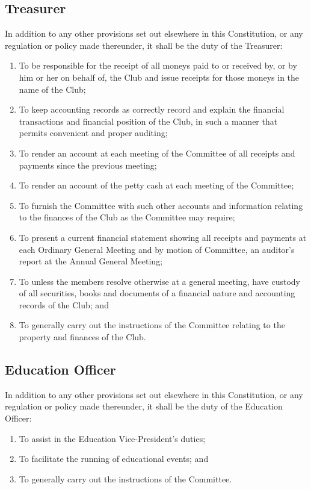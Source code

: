 \documentclass[11pt]{article} %
\begin{document}
\subsection{Treasurer}
In addition to any other provisions set out elsewhere in this Constitution, or any regulation or policy made thereunder, it shall be the duty of the Treasurer:
\begin{enumerate}
	\item To be responsible for the receipt of all moneys paid to or received by, or by him or her on behalf of, the Club and issue receipts for those moneys in the name of the Club;
	\item To keep accounting records as correctly record and explain the financial transactions and financial position of the Club, in such a manner that permits convenient and proper auditing;
	\item To render an account at each meeting of the Committee of all receipts and payments since the previous meeting;
	\item To render an account of the petty cash at each meeting of the Committee;
	\item To furnish the Committee with such other accounts and information relating to the finances of the Club as the Committee may require;
	\item To present a current financial statement showing all receipts and payments at each Ordinary General Meeting and by motion of Committee, an auditor's report at the Annual General Meeting;
	\item To unless the members resolve otherwise at a general meeting, have custody of all securities, books and documents of a financial nature and accounting records of the Club; and
	\item To generally carry out the instructions of the Committee relating to the property and finances of the Club.
\end{enumerate}

\subsection{Education Officer}
In addition to any other provisions set out elsewhere in this Constitution, or any regulation or policy made thereunder, it shall be the duty of the Education Officer:
\begin{enumerate}
	\item To assist in the Education Vice-President's duties;
	\item To facilitate the running of educational events; and
	\item To generally carry out the instructions of the Committee.
\end{enumerate}
\end{document}
